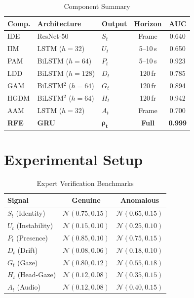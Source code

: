 \documentclass[journal]{IEEEtran}
\begin{document}
\begin{table}[!ht]
\caption{Component Summary}
\label{tab:summary}
\centering
\footnotesize
\begin{tabular}{@{}lllcc@{}}
\toprule
\textbf{Comp.} & \textbf{Architecture} & \textbf{Output} & \textbf{Horizon} & \textbf{AUC} \\
\midrule
IDE & ResNet-50 & $S_t$ & Frame & 0.640 \\
IIM & LSTM ($h{=}32$) & $U_t$ & 5--10\,s & 0.650 \\
PAM & BiLSTM ($h{=}64$) & $P_t$ & 5--10\,s & 0.923 \\
LDD & BiLSTM ($h{=}128$) & $D_t$ & 120\,fr & 0.785 \\
GAM & BiLSTM$^2$ ($h{=}64$) & $G_t$ & 120\,fr & 0.894 \\
HGDM & BiLSTM$^2$ ($h{=}64$) & $H_t$ & 120\,fr & 0.942 \\
AAM & LSTM ($h{=}32$) & $A_t$ & Frame & 0.700 \\
\textbf{RFE} & \textbf{GRU} & $\bm{\rho_t}$ & \textbf{Full} & \textbf{0.999} \\
\bottomrule
\end{tabular}
\end{table}


\section{Experimental Setup}
\label{sec:setup}

\begin{table}[!ht]
\caption{Expert Verification Benchmarks}
\label{tab:benchmarks}
\centering
\footnotesize
\begin{tabular}{@{}lcc@{}}
\toprule
\textbf{Signal} & \textbf{Genuine} & \textbf{Anomalous} \\
\midrule
$S_t$ (Identity) & $\mathcal{N}(0.75, 0.15)$ & $\mathcal{N}(0.65, 0.15)$ \\
$U_t$ (Instability) & $\mathcal{N}(0.15, 0.10)$ & $\mathcal{N}(0.25, 0.10)$ \\
$P_t$ (Presence) & $\mathcal{N}(0.85, 0.10)$ & $\mathcal{N}(0.75, 0.15)$ \\
$D_t$ (Drift) & $\mathcal{N}(0.08, 0.06)$ & $\mathcal{N}(0.18, 0.10)$ \\
$G_t$ (Gaze) & $\mathcal{N}(0.80, 0.12)$ & $\mathcal{N}(0.55, 0.18)$ \\
$H_t$ (Head-Gaze) & $\mathcal{N}(0.12, 0.08)$ & $\mathcal{N}(0.35, 0.15)$ \\
$A_t$ (Audio) & $\mathcal{N}(0.12, 0.08)$ & $\mathcal{N}(0.40, 0.15)$ \\
\bottomrule
\end{tabular}
\end{table}
\end{document}
